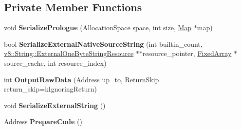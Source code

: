 \subsection*{Private Member Functions}
\begin{DoxyCompactItemize}
\item 
void {\bfseries Serialize\+Prologue} (Allocation\+Space space, int size, \hyperlink{classv8_1_1internal_1_1_map}{Map} $\ast$map)\hypertarget{classv8_1_1internal_1_1_serializer_1_1_object_serializer_aa086b83cfc1fd8477f8dc7d5722b0a6e}{}\label{classv8_1_1internal_1_1_serializer_1_1_object_serializer_aa086b83cfc1fd8477f8dc7d5722b0a6e}

\item 
bool {\bfseries Serialize\+External\+Native\+Source\+String} (int builtin\+\_\+count, \hyperlink{classv8_1_1_string_1_1_external_one_byte_string_resource}{v8\+::\+String\+::\+External\+One\+Byte\+String\+Resource} $\ast$$\ast$resource\+\_\+pointer, \hyperlink{classv8_1_1internal_1_1_fixed_array}{Fixed\+Array} $\ast$source\+\_\+cache, int resource\+\_\+index)\hypertarget{classv8_1_1internal_1_1_serializer_1_1_object_serializer_a1653170309c437b96e44362ef2164bc1}{}\label{classv8_1_1internal_1_1_serializer_1_1_object_serializer_a1653170309c437b96e44362ef2164bc1}

\item 
int {\bfseries Output\+Raw\+Data} (Address up\+\_\+to, Return\+Skip return\+\_\+skip=k\+Ignoring\+Return)\hypertarget{classv8_1_1internal_1_1_serializer_1_1_object_serializer_a0081e6b4fb1166f2136bbbcd70b945f5}{}\label{classv8_1_1internal_1_1_serializer_1_1_object_serializer_a0081e6b4fb1166f2136bbbcd70b945f5}

\item 
void {\bfseries Serialize\+External\+String} ()\hypertarget{classv8_1_1internal_1_1_serializer_1_1_object_serializer_a51c6cf6eaea2198bd4e8c7862333511b}{}\label{classv8_1_1internal_1_1_serializer_1_1_object_serializer_a51c6cf6eaea2198bd4e8c7862333511b}

\item 
Address {\bfseries Prepare\+Code} ()\hypertarget{classv8_1_1internal_1_1_serializer_1_1_object_serializer_a5ff35f46e7cf21ad9cb15c30b92d5d52}{}\label{classv8_1_1internal_1_1_serializer_1_1_object_serializer_a5ff35f46e7cf21ad9cb15c30b92d5d52}

\end{DoxyCompactItemize}
